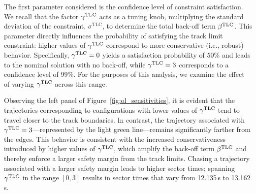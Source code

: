 The first parameter considered is the confidence level of constraint satisfaction. 
We recall that the factor $\gamma^\textrm{TLC}$ acts as a tuning knob, multiplying the standard deviation of the constraint, $\sigma^\textrm{TLC}$, to determine the total back-off term $\beta^\textrm{TLC}$. 
This parameter directly influences the probability of satisfying the track limit constraint: higher values of $\gamma^\textrm{TLC}$ correspond to more conservative (i.e., robust) behavior. 
Specifically, $\gamma^\textrm{TLC} = 0$ yields a satisfaction probability of 50\% and leads to the nominal solution with no back-off, while $\gamma^\textrm{TLC} = 3$ corresponds to a confidence level of 99\%. 
For the purposes of this analysis, we examine the effect of varying $\gamma^\textrm{TLC}$ across this range. 


Observing the left panel of Figure~\ref{fig:ol_sensitivities}, it is evident that the trajectories corresponding to configurations with lower values of $\gamma^\textrm{TLC}$ tend to travel closer to the track boundaries. In contrast, the trajectory associated with $\gamma^\textrm{TLC} = 3$---represented by the light green line---remains significantly farther from the edges.
This behavior is consistent with the increased conservativeness introduced by higher values of $\gamma^\textrm{TLC}$, which amplify the back-off term $\beta^\textrm{TLC}$ and thereby enforce a larger safety margin from the track limits.
Chasing a trajectory associated with a larger safety margin leads to higher sector times; spanning $\gamma^\textrm{TLC}$ in the range $\left[0,3\right]$ results in sector times that vary from 12.135\,s to 13.162\,s.

